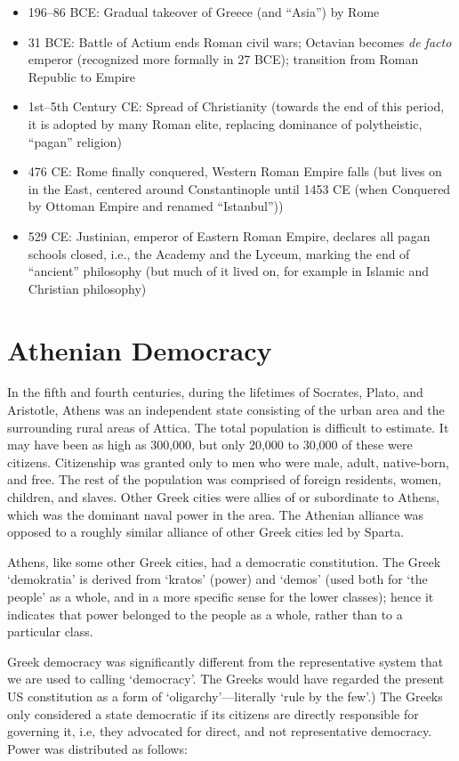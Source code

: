 \documentclass[oneside]{article}
\begin{document}
\begin{itemize}
\item{196--86 BCE: Gradual takeover of Greece (and ``Asia'') by Rome}
\item{31 BCE: Battle of Actium ends Roman civil wars; Octavian becomes \emph{de facto} emperor (recognized more formally in 27 BCE); transition from Roman Republic to Empire}
\item{1st--5th Century CE: Spread of Christianity (towards the end of this period, it is  adopted by many Roman elite, replacing dominance of polytheistic, ``pagan'' religion)}
\item{476 CE: Rome finally conquered, Western Roman Empire falls (but lives on in the East, centered around Constantinople until 1453 CE (when Conquered by Ottoman Empire and renamed ``Istanbul''))}
\item{529 CE: Justinian, emperor of Eastern Roman Empire, declares all pagan schools closed, i.e., the Academy and the Lyceum, marking the end of ``ancient'' philosophy (but much of it lived on, for example in Islamic and Christian philosophy)}
\end{itemize}




\section*{Athenian Democracy}

In the fifth and fourth centuries, during the lifetimes of Socrates, Plato, and Aristotle, Athens was an independent state consisting of the urban area and the surrounding rural areas of Attica. The total population is difficult to estimate. It may have been as high as 300,000, but only 20,000 to 30,000 of these were citizens. Citizenship was granted only to men who were male, adult, native-born, and free. The rest of the population was comprised of foreign residents, women, children, and slaves. Other Greek cities were allies of or subordinate to Athens, which was the dominant naval power in the area. The Athenian alliance was opposed to a roughly similar alliance of other Greek cities led by Sparta.  

Athens, like some other Greek cities, had a democratic constitution. The Greek `demokratia'  is derived from `kratos' (power) and `demos' (used both for `the people’ as a whole, and in a more specific sense for the lower classes); hence it indicates that power belonged to the people as a whole, rather than to a particular class. 

Greek democracy was significantly different from the representative system that we are used to calling `democracy'. The Greeks would have regarded the present US constitution as a form of `oligarchy’---literally ‘rule by the few’.)  The Greeks only considered a state democratic  if its citizens are directly responsible for governing it, i.e, they advocated for direct, and not representative democracy. Power was distributed as follows:
\end{document}
